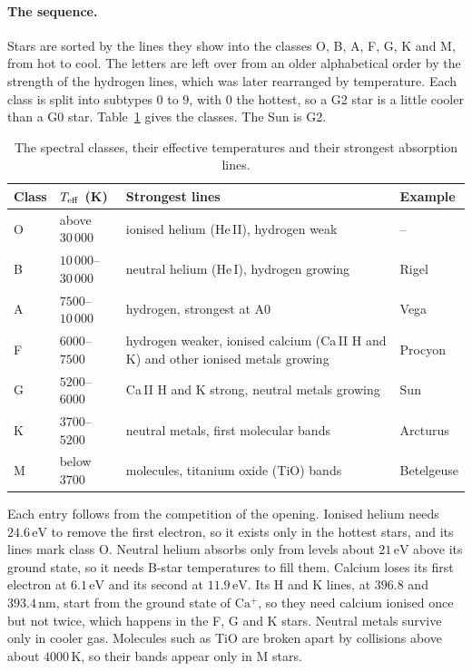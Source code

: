 \paragraph{The sequence.} Stars are sorted by the lines they show into the classes O, B, A, F, G, K and M, from hot to cool. The letters are left over from an older alphabetical order by the strength of the hydrogen lines, which was later rearranged by temperature. Each class is split into subtypes $0$ to $9$, with $0$ the hottest, so a G2 star is a little cooler than a G0 star. Table~\ref{rad:tab:classes} gives the classes. The Sun is G2.

\begin{table}[htbp]
	\centering
	\begin{tabular}{@{}l l p{} l@{}}
		\toprule
		\textbf{Class} & $T_{\rm eff}$ (K) & \textbf{Strongest lines} & \textbf{Example} \\
		\midrule
		O & above $30\,000$ & ionised helium (He\,II), hydrogen weak & -- \\
		B & $10\,000$--$30\,000$ & neutral helium (He\,I), hydrogen growing & Rigel \\
		A & $7500$--$10\,000$ & hydrogen, strongest at A0 & Vega \\
		F & $6000$--$7500$ & hydrogen weaker, ionised calcium (Ca\,II H and K) and other ionised metals growing & Procyon \\
		G & $5200$--$6000$ & Ca\,II H and K strong, neutral metals growing & Sun \\
		K & $3700$--$5200$ & neutral metals, first molecular bands & Arcturus \\
		M & below $3700$ & molecules, titanium oxide (TiO) bands & Betelgeuse \\
		\bottomrule
	\end{tabular}
	\caption{The spectral classes, their effective temperatures and their strongest absorption lines.}
	\label{rad:tab:classes}
\end{table}

Each entry follows from the competition of the opening. Ionised helium needs $24.6\,\mathrm{eV}$ to remove the first electron, so it exists only in the hottest stars, and its lines mark class O. Neutral helium absorbs only from levels about $21\,\mathrm{eV}$ above its ground state, so it needs B-star temperatures to fill them. Calcium loses its first electron at $6.1\,\mathrm{eV}$ and its second at $11.9\,\mathrm{eV}$. Its H and K lines, at $396.8$ and $393.4\,\mathrm{nm}$, start from the ground state of $\mathrm{Ca^+}$, so they need calcium ionised once but not twice, which happens in the F, G and K stars. Neutral metals survive only in cooler gas. Molecules such as TiO are broken apart by collisions above about $4000\,\mathrm K$, so their bands appear only in M stars.

